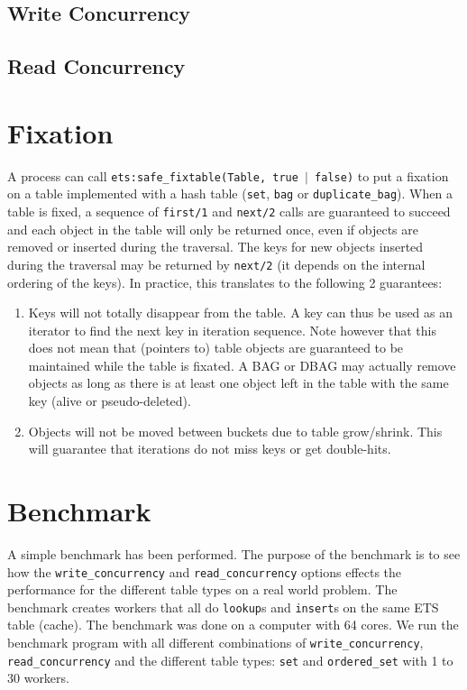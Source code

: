 \documentclass[aps,pre,preprint,nofootinbib]{revtex4}
\begin{document}
\subsection{Write Concurrency}

\subsection{Read Concurrency}

\section{Fixation}

A process can call \texttt{ets:safe\_fixtable(Table, true $|$ false)} to put a fixation on a table implemented with a hash table (\verb|set|, \verb|bag| or \verb|duplicate_bag|).
When a table is fixed, a sequence of \verb|first/1| and \verb|next/2| calls are guaranteed to succeed and each object in the table will only be returned once, even if objects are removed or inserted during the traversal.
The keys for new objects inserted during the traversal may be returned by \verb|next/2| (it depends on the internal ordering of the keys).
In practice, this translates to the following 2 guarantees:

\begin{enumerate}
  \item Keys will not totally disappear from the table.
    A key can thus be used as an iterator to find the next key in iteration sequence.
    Note however that this does not mean that (pointers to) table objects are guaranteed to be maintained while the table is fixated.
    A BAG or DBAG may actually remove objects as long as there is at least one object left in the table with the same key (alive or pseudo-deleted).
    \item Objects will not be moved between buckets due to table grow/shrink.
      This will guarantee that iterations do not miss keys or get double-hits.
\end{enumerate}

\section{Benchmark} \label{sec:benchmark}

  A simple benchmark has been performed.
  The purpose of the benchmark is to see how the \verb|write_concurrency| and \verb|read_concurrency| options effects the performance for the different table types on a real world problem.
  The benchmark creates workers that all do \verb|lookup|s and \verb|insert|s on the same ETS table (cache).
  The benchmark was done on a computer with 64 cores.
  We run the benchmark program with all different combinations of \verb|write_concurrency|, \verb|read_concurrency| and the different table types: \verb|set| and \verb|ordered_set| with 1 to 30 workers.
  
\end{document}
